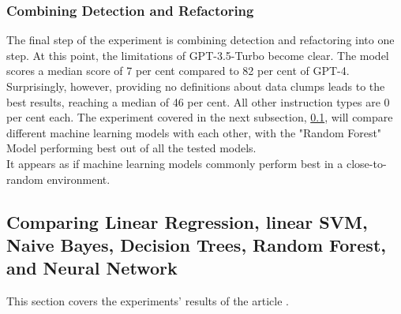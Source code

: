 \subsubsection{Combining Detection and Refactoring}
The final step of the experiment is combining detection and refactoring into one step. At this point, the limitations of GPT-3.5-Turbo become clear. The model scores a median score of 7 per cent compared to 82 per cent of GPT-4.
Surprisingly, however, providing no definitions about data clumps leads to the best results, reaching a median of 46 per cent. 
All other instruction types are 0 per cent each.
The experiment covered in the next subsection, \ref{comparingAlgorithms}, will compare different machine learning models with each other, with the "Random Forest" Model performing best out of all the tested models.\\
It appears as if machine learning models commonly perform best in a close-to-random environment.
\subsection{Comparing Linear Regression, linear SVM, Naive Bayes, Decision Trees, Random Forest, and Neural Network} \label{comparingAlgorithms}
This section covers the experiments' results of the article \cite[The effectiveness of supervised machine learning algorithms in predicting software refactoring]{aniche2020effectiveness}.
